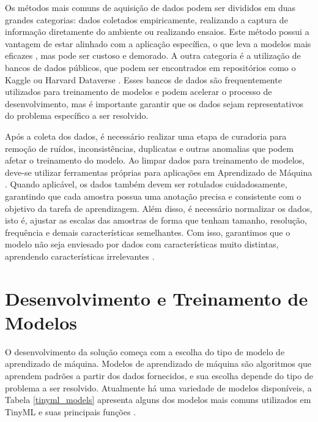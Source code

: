 \documentclass[repeatfields,xlists,xpacks,oneside]{ufrgscca}
\begin{document}
Os métodos mais comuns de aquisição de dados podem ser divididos em duas grandes categorias: dados coletados empiricamente, realizando a captura de informação diretamente do ambiente ou realizando ensaios. Este método possui a vantagem de estar alinhado com a aplicação específica, o que leva a modelos mais eficazes \cite{specificDomain}, mas pode ser custoso e demorado. A outra categoria é a utilização de bancos de dados públicos, que podem ser encontrados em repositórios como o Kaggle \cite{kaggle} ou Harvard Dataverse \cite{harvard_dataverse}. Esses bancos de dados são frequentemente utilizados para treinamento de modelos e podem acelerar o processo de desenvolvimento, mas é importante garantir que os dados sejam representativos do problema específico a ser resolvido.

Após a coleta dos dados, é necessário realizar uma etapa de curadoria para remoção de ruídos, inconsistências, duplicatas e outras anomalias que podem afetar o treinamento do modelo. Ao limpar dados para treinamento de modelos, deve-se utilizar ferramentas próprias para aplicações em Aprendizado de Máquina \cite{Whang2023}. Quando aplicável, os dados também devem ser rotulados cuidadosamente, garantindo que cada amostra possua uma anotação precisa e consistente com o objetivo da tarefa de aprendizagem. Além disso, é necessário normalizar os dados, isto é, ajustar as escalas das amostras de forma que tenham tamanho, resolução, frequência e demais características semelhantes. Com isso, garantimos que o modelo não seja enviesado por dados com características muito distintas, aprendendo características irrelevantes \cite{Ahmed2022}.


\section{Desenvolvimento e Treinamento de Modelos}

O desenvolvimento da solução começa com a escolha do tipo de modelo de aprendizado de máquina. Modelos de aprendizado de máquina são algoritmos que aprendem padrões a partir dos dados fornecidos, e sua escolha depende do tipo de problema a ser resolvido. Atualmente há uma variedade de modelos disponíveis, a Tabela \ref{tinyml_models} apresenta alguns dos modelos mais comuns utilizados em TinyML e suas principais funções \cite{tinyModels}.
\end{document}
